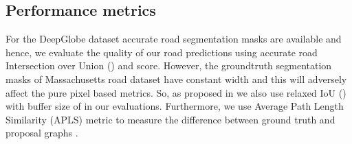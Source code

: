 \documentclass[letterpaper, 10 pt, conference]{ieeeconf}
\begin{document}
\vspace{-10pt}
\subsection{Performance metrics} For the DeepGlobe dataset accurate road segmentation masks are available and hence, we evaluate the quality of our road predictions using accurate road Intersection over Union () and  score. However, the groundtruth segmentation masks of Massachusetts road dataset have constant width and this will adversely affect the pure pixel based metrics. So, as proposed in \cite{mnih2012learning} we also use relaxed IoU () with buffer size of  in our evaluations. Furthermore, we use Average Path Length Similarity (APLS) metric to measure the difference between ground truth and proposal graphs \cite{van2017spacenet}. 
\end{document}
